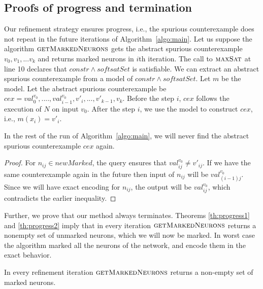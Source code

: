 \subsection{Proofs of progress and termination}
Our refinement strategy ensures progress, i.e., the spurious counterexample does not
repeat in the future
iterations of Algorithm~\ref{algo:main}. Let us suppose the algorithm
$\textsc{getMarkedNeurons}$ gets the abstract spurious counterexample
${v_0}, {v_1}, ... {v_k}$ and
returns marked neurons in $i$th iteration.
The call to $\textsc{maxSat}{}$ at line 10
declares that $constr \land softsatSet$ is satisfiable.
We can extract an abstract spurious counterexample from a model
of $constr \land softsatSet$.
Let $m$ be the model.
Let the abstract spurious counterexample be $cex = val_0^{v_0}, ...., val^{v_0}_{i-1},v'_{i},...,v'_{k-1},v_k$.
Before the step $i$, $cex$ follows the execution of $N$ on input $v_0$.
After the step $i$, we use the model to construct $cex$, i.e., $m(x_i) = v'_i$.

\begin{theorem}
  In the rest of the run of Algorithm~\ref{algo:main}, we will never find the abstract
  spurious counterexample
  $cex$ again.
\end{theorem}
\begin{proof}
  For $n_{ij} \in newMarked$, the \maxsat{} query ensures that
  $val^{v_0}_{ij} \neq v'_{ij}$.
  If we have the same counterexample again in the future then
  input of $n_{ij}$ will be $val^{v_0}_{(i-1)j}$.
  Since we will have exact encoding for $n_{ij}$, the output
  will be $val^{v_0}_{ij}$, which contradicts the earlier inequality.  
\end{proof}

Further, we prove that our method always terminates.
%
Theorems \ref{th:progress1} and \ref{th:progress2} imply that in every
iteration $\textsc{getMarkedNeurons}$
returns a nonempty set of unmarked neurons, which we will now be marked. In worst case the algorithm marked all 
the neurons of the network, and encode them in the exact behavior. 





\begin{theorem}
  \label{th:progress1}
  In every refinement iteration $\textsc{getMarkedNeurons}$
  returns a non-empty set of marked neurons. 
\end{theorem}

